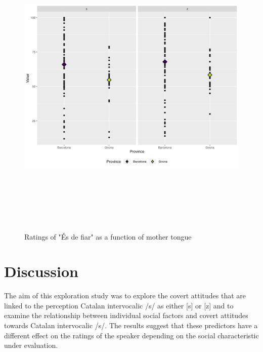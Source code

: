 \documentclass[
  a4paper,
  11pt,
  twocolumn]{article}
\begin{document}
\begin{figure}[!ht]
\begin{center}
\includegraphics[height=15cm]{./includes/figures/fiar.png}
\caption{Ratings of "És de fiar" as a function of mother tongue}\label{fig:fiar}
\end{center}
\end{figure}

\section{Discussion}

The aim of this exploration study was to explore the covert attitudes
that are linked to the perception Catalan intervocalic /s/ as either
{[}s{]} or {[}z{]} and to examine the relationship between individual
social factors and covert attitudes towards Catalan intervocalic /s/.
The results suggest that these predictors have a different effect on the
ratings of the speaker depending on the social characteristic under
evaluation.
\end{document}
